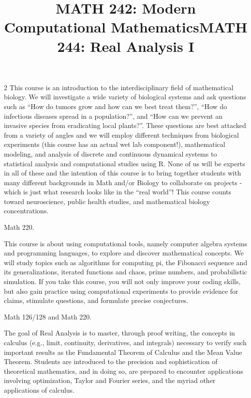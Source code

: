 \documentclass[12pt]{article}
\newcommand{\bolder}{\textbf}
\begin{document}
\begin{multicols}{2}
This course is an introduction to the interdisciplinary field of mathematical biology. We will investigate a wide variety of biological systems and ask questions such as “How do tumors grow and how can we best treat them?”, “How do infectious diseases spread in a population?”, and “How can we prevent an invasive species from eradicating local plants?”.
These questions are best attacked from a variety of angles and we will employ different techniques from biological experiments (this course has an actual wet lab component!), mathematical modeling, and analysis of discrete and continuous dynamical systems to statistical analysis and computational studies using R. None of us will be experts in all of these and the intention of this course is to bring together students with many different backgrounds in Math and/or Biology to collaborate on projects - which is just what research looks like in the “real world”!  This course counts toward neuroscience, public health studies, and mathematical biology concentrations.


\begin{tcolorbox}[colback=white, colframe=black]
    \begin{center}
    \title{{\large \bolder{MATH 242: Modern Computational Mathematics}}}
    \end{center}
\end{tcolorbox}

 Math 220.

This course is about using computational tools, namely computer algebra systems and programming languages, to explore and discover mathematical concepts. We will study topics such as algorithms for computing pi, the Fibonacci sequence and its generalizations, iterated functions and chaos, prime numbers, and probabilistic simulation. If you take this course, you will not only improve your coding skills, but also gain practice using computational experiments to provide evidence for claims, stimulate questions, and formulate precise conjectures. 


\begin{tcolorbox}[colback=white, colframe=black]
    \begin{center}
    \title{{\large \bolder{MATH 244: Real Analysis I}}}
    \end{center}
\end{tcolorbox}

 Math 126/128 and Math 220.

The goal of Real Analysis is to master, through proof writing, the concepts in calculus (e.g., limit, continuity, derivatives, and integrals) necessary to verify such important results as the Fundamental Theorem of Calculus and the Mean Value Theorem. Students are introduced to the precision and sophistication of theoretical mathematics, and in doing so, are prepared to encounter applications involving optimization, Taylor and Fourier series, and the myriad other applications of calculus.



\end{multicols}
\end{document}
